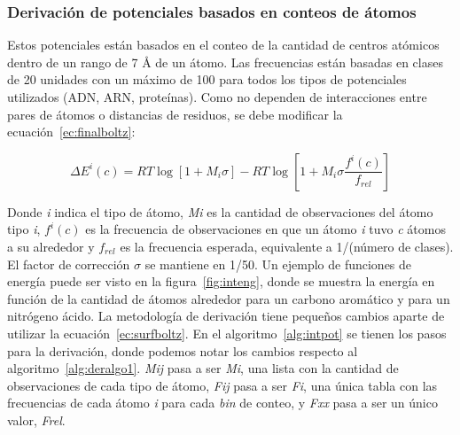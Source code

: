 \subsubsection{Derivación de potenciales basados en conteos de átomos}
\par
Estos potenciales están basados en el conteo de la cantidad de centros atómicos dentro de un rango de 7 \si{\angstrom} de un átomo.
Las frecuencias están basadas en clases de 20 unidades con un máximo de 100 para todos los tipos de potenciales utilizados (ADN, ARN, proteínas).
Como no dependen de interacciones entre pares de átomos o distancias de residuos, se debe modificar la ecuación~\ref{ec:finalboltz}:

\begin{equation}
\Delta E^{i}(c) = RT\log \left[1 + M_{i}\sigma\right] - RT\log \left[ 1 + M_{i}\sigma \frac{f^{i}(c)}{f_{rel}} \right] \label{ec:surfboltz}
\end{equation}

Donde \textit{i} indica el tipo de átomo, \textit{Mi} es la cantidad de observaciones del átomo tipo \textit{i}, \textit{$f^{i}(c)$} es la frecuencia de observaciones en que un átomo \textit{i} tuvo \textit{c} átomos a su alrededor y \textit{$f_{rel}$} es la frecuencia esperada, equivalente a 1/(número de clases).
El factor de corrección $\sigma$ se mantiene en 1/50.
Un ejemplo de funciones de energía puede ser visto en la figura~\ref{fig:inteng}, donde se muestra la energía en función de la cantidad de átomos alrededor para un carbono aromático y para un nitrógeno ácido.
La metodología de derivación tiene pequeños cambios aparte de utilizar la ecuación~\ref{ec:surfboltz}.
En el algoritmo~\ref{alg:intpot} se tienen los pasos para la derivación, donde podemos notar los cambios respecto al algoritmo~\ref{alg:deralgo1}.
\textit{Mij} pasa a ser \textit{Mi}, una lista con la cantidad de observaciones de cada tipo de átomo, \textit{Fij} pasa a ser \textit{Fi}, una única tabla con las frecuencias de cada átomo \textit{i} para cada \textit{bin} de conteo, y \textit{Fxx} pasa a ser un único valor, \textit{Frel}.

